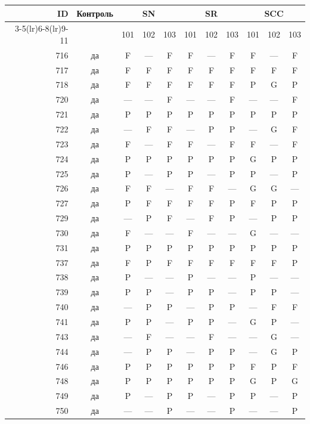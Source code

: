 \begin{table}[p]\centering\small
\begin{tabular*}{\textwidth}{@{\extracolsep{\fill}}rc*{9}{c}@{}}\toprule
ID & Контроль & \multicolumn{3}{c}{SN} & \multicolumn{3}{c}{SR} & \multicolumn{3}{c}{SCC}\\
\cmidrule(lr){3-5}\cmidrule(lr){6-8}\cmidrule(lr){9-11}
 & & 101 & 102 & 103 & 101 & 102 & 103 & 101 & 102 & 103\\\midrule
716 & да & F & — & F & F & — & F & F & — & F\\
717 & да & F & F & F & F & F & F & F & F & F\\
718 & да & F & F & F & F & F & F & P & G & P\\
720 & да & — & — & F & — & — & F & — & — & F\\
721 & да & P & P & P & P & P & P & P & P & P\\
722 & да & — & F & F & — & P & P & — & G & F\\
723 & да & F & — & F & F & — & F & F & — & F\\
724 & да & P & P & P & P & P & P & G & P & P\\
725 & да & P & — & P & P & — & P & P & — & P\\
726 & да & F & F & — & F & F & — & G & G & —\\
727 & да & P & F & F & F & F & P & F & P & P\\
729 & да & — & P & F & — & F & P & — & P & P\\
730 & да & F & — & — & F & — & — & G & — & —\\
731 & да & P & P & P & P & P & P & P & P & P\\
737 & да & F & P & F & F & F & F & F & F & P\\
738 & да & P & — & — & P & — & — & P & — & —\\
739 & да & P & P & — & P & P & — & P & P & —\\
740 & да & — & P & P & — & P & P & — & F & F\\
741 & да & P & P & — & P & P & — & G & P & —\\
743 & да & — & F & — & — & F & — & — & G & —\\
744 & да & — & P & P & — & P & P & — & G & P\\
746 & да & P & P & P & P & P & P & F & P & F\\
748 & да & P & P & P & P & P & P & G & P & G\\
749 & да & P & — & P & P & — & P & P & — & P\\
750 & да & — & — & P & — & — & P & — & — & P\\

\end{tabular*}
\end{table}
